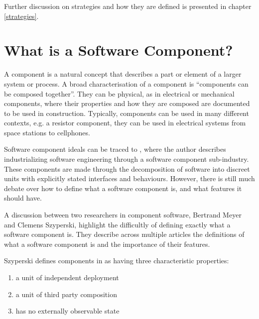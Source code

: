 Further discussion on strategies and how they are defined is presented in chapter \ref{strategies}.

\section{What is a Software Component?}
\label{background.components}
A component is a natural concept that describes a part or element of a larger system or process.
A broad characterisation of a component is ``components can be composed together''.
They can be physical, as in electrical or mechanical components, where their properties and how they are composed are documented to be used in construction.
Typically, components can be used in many different contexts, e.g. a resistor component, they can be used in electrical systems from space stations to cellphones.   

Software component ideals can be traced to \citep{McIlroy1969}, where the author describes industrializing software engineering through a software component sub-industry.
These components are made through the decomposition of software into discreet units with explicitly stated interfaces and behaviours.
However, there is still much debate over how to define what a software component is, and what features it should have.

A discussion between two researchers in component software, Bertrand Meyer and Clemens Szyperski, highlight the difficultly of defining exactly what a software component is. 
They describe across multiple articles \citep{Meyer1999,Szyperski2000a, Szyperski2000, Meyer2000} the definitions of what a software component is and the importance of their features.

Szyperski defines components in \citep{Szyperski2002} as having three characteristic properties:
\begin{enumerate}
  \item a unit of independent deployment
  \item a unit of third party composition
  \item has no externally observable state
\end{enumerate}

